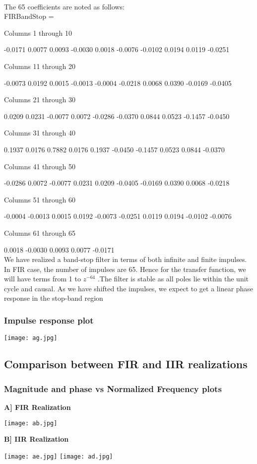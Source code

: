 \documentclass[12pt]{article}
\begin{document}
\\The 65 coefficients are noted as follows:
\\FIRBandStop =

  Columns 1 through 10

   -0.0171    0.0077    0.0093   -0.0030    0.0018   -0.0076   -0.0102    0.0194    0.0119   -0.0251

  Columns 11 through 20

   -0.0073    0.0192    0.0015   -0.0013   -0.0004   -0.0218    0.0068    0.0390   -0.0169   -0.0405

  Columns 21 through 30

    0.0209    0.0231   -0.0077    0.0072   -0.0286   -0.0370    0.0844    0.0523   -0.1457   -0.0450

  Columns 31 through 40

    0.1937    0.0176    0.7882    0.0176    0.1937   -0.0450   -0.1457    0.0523    0.0844   -0.0370

  Columns 41 through 50

   -0.0286    0.0072   -0.0077    0.0231    0.0209   -0.0405   -0.0169    0.0390    0.0068   -0.0218

  Columns 51 through 60

   -0.0004   -0.0013    0.0015    0.0192   -0.0073   -0.0251    0.0119    0.0194   -0.0102   -0.0076

  Columns 61 through 65

    0.0018   -0.0030    0.0093    0.0077   -0.0171
   \\We have realized a band-stop filter in terms of both infinite and finite impulses. In FIR case, the
number of impulses are 65. Hence for the transfer function, we will have terms from 1 to $z^{−64}$
 .The
filter is stable as all poles lie within the unit cycle and causal. As we have shifted the impulses, we
expect to get a linear phase
response in the stop-band region
\subsubsection{Impulse response plot}
\begin{center}
    \texttt{[image: ag.jpg]}
\end{center}


\subsection{Comparison between FIR and IIR realizations}
\subsubsection{Magnitude and phase vs Normalized Frequency plots}
\textbf{A] FIR Realization}
\begin{center}
    \texttt{[image: ab.jpg]}
\end{center}
\textbf{B] IIR Realization}
\begin{center}
    \texttt{[image: ae.jpg]}
    \texttt{[image: ad.jpg]}
\end{center}
\end{document}
